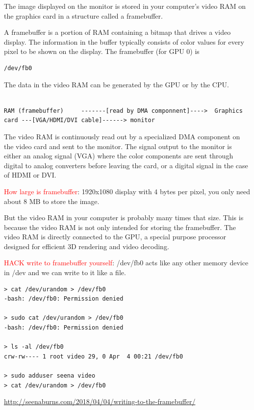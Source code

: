 The image displayed on the monitor is stored in your computer’s video RAM on the
graphics card in a structure called a framebuffer.

A framebuffer is a portion of RAM containing a bitmap that drives a video
display.
The information in the buffer typically consists of color values for every pixel
to be shown on the display. The framebuffer (for GPU 0) is 
\begin{verbatim}
/dev/fb0
\end{verbatim}


The data in the video RAM can be generated by the GPU or by the CPU. 

\begin{verbatim}

RAM (framebuffer)     -------[read by DMA componnent]---->  Graphics card ---[VGA/HDMI/DVI cable]------> monitor
\end{verbatim}

The video RAM is continuously read out by a specialized DMA component on the
video card and sent to the monitor.
The signal output to the monitor is either an analog signal (VGA) where the
color components are sent through digital to analog converters before leaving
the card, or a digital signal in the case of HDMI or DVI.


\textcolor{red}{How large is framebuffer}: 1920x1080 display with 4 bytes per
pixel, you only need about 8 MB to store the image.


But the video RAM in your computer is probably many times that size. This is
because the video RAM is not only intended for storing the framebuffer. The
video RAM is directly connected to the GPU, a special purpose processor designed
for efficient 3D rendering and video decoding.

\textcolor{red}{HACK write to framebuffer yourself}:
/dev/fb0 acts like any other memory device in /dev and we can write to it like a file.

\begin{verbatim}
> cat /dev/urandom > /dev/fb0
-bash: /dev/fb0: Permission denied

> sudo cat /dev/urandom > /dev/fb0
-bash: /dev/fb0: Permission denied

> ls -al /dev/fb0
crw-rw---- 1 root video 29, 0 Apr  4 00:21 /dev/fb0

> sudo adduser seena video
> cat /dev/urandom > /dev/fb0
\end{verbatim}

\url{http://seenaburns.com/2018/04/04/writing-to-the-framebuffer/}

